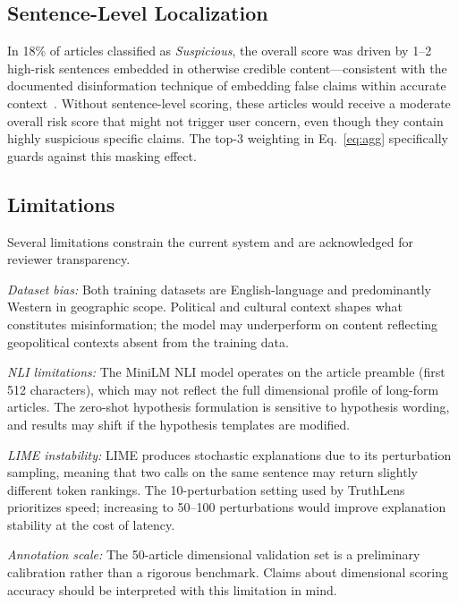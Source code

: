 \documentclass[journal]{IEEEtran}
\begin{document}
\subsection{Sentence-Level Localization}

In 18\% of articles classified as \textit{Suspicious}, the overall score was driven by
1--2 high-risk sentences embedded in otherwise credible content—consistent with the
documented disinformation technique of embedding false claims within accurate
context~\cite{zhou2020survey}. Without sentence-level scoring, these articles would receive
a moderate overall risk score that might not trigger user concern, even though they contain
highly suspicious specific claims. The top-3 weighting in Eq.~\ref{eq:agg} specifically
guards against this masking effect.

\subsection{Limitations}

Several limitations constrain the current system and are acknowledged for reviewer
transparency.

\textit{Dataset bias:} Both training datasets are English-language and predominantly
Western in geographic scope. Political and cultural context shapes what constitutes
misinformation; the model may underperform on content reflecting geopolitical contexts
absent from the training data.

\textit{NLI limitations:} The MiniLM NLI model operates on the article preamble (first
512 characters), which may not reflect the full dimensional profile of long-form articles.
The zero-shot hypothesis formulation is sensitive to hypothesis wording, and results may
shift if the hypothesis templates are modified.

\textit{LIME instability:} LIME produces stochastic explanations due to its perturbation
sampling, meaning that two calls on the same sentence may return slightly different token
rankings. The 10-perturbation setting used by TruthLens prioritizes speed; increasing to
50--100 perturbations would improve explanation stability at the cost of latency.

\textit{Annotation scale:} The 50-article dimensional validation set is a preliminary
calibration rather than a rigorous benchmark. Claims about dimensional scoring accuracy
should be interpreted with this limitation in mind.

\end{document}
